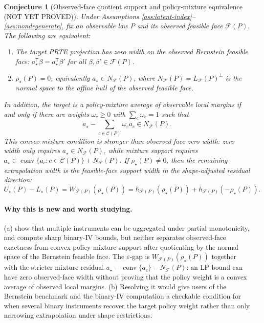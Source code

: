 \documentclass[11pt]{article}
\newcommand{\transpose}{\mathsf{T}}
\theoremstyle{definition}
\theoremstyle{plain}
\newtheorem{conjecture}{Conjecture}
\theoremstyle{remark}
\begin{document}
\begin{conjecture}[Observed-face quotient support and policy-mixture equivalence (NOT YET PROVED)]\label{conj:cone-equivalence}
Under Assumptions \ref{ass:latent-index}--\ref{ass:nondegenerate}, fix an observable law \(P\) and its observed feasible face \(\mathcal F(P)\). The following are equivalent:
\begin{enumerate}[label=(\roman*),leftmargin=*]
\item The target PRTE projection has zero width on the observed Bernstein feasible face: \(a_\star^\transpose\beta=a_\star^\transpose\beta'\) for all \(\beta,\beta'\in\mathcal F(P)\).
\item \(\rho_\star(P)=0\), equivalently \(a_\star\in N_{\mathcal F}(P)\), where \(N_{\mathcal F}(P)=L_{\mathcal F}(P)^\perp\) is the normal space to the affine hull of the observed feasible face.
\end{enumerate}
In addition, the target is a policy-mixture average of observable local margins if and only if there are weights \(\omega_c\ge0\) with \(\sum_c\omega_c=1\) such that
\[
a_\star-\sum_{c\in\mathcal C(P)}\omega_ca_c\in N_{\mathcal F}(P).
\]
This convex-mixture condition is stronger than observed-face zero width: zero width only requires \(a_\star\in N_{\mathcal F}(P)\), while mixture support requires \(a_\star\in\operatorname{conv}\{a_c:c\in\mathcal C(P)\}+N_{\mathcal F}(P)\). If \(\rho_\star(P)\neq0\), then the remaining extrapolation width is the feasible-face support width in the shape-adjusted residual direction:
\[
U_\star(P)-L_\star(P)
=W_{\mathcal F(P)}(\rho_\star(P))
=h_{\mathcal F(P)}(\rho_\star(P))+h_{\mathcal F(P)}(-\rho_\star(P)).
\]
\end{conjecture}

\paragraph{Why this is new and worth studying.}
(a) \citet{MogstadTorgovitskyWalters2024} show that multiple instruments can be aggregated under partial monotonicity, and \citet{HanYang2024} compute sharp binary-IV bounds, but neither separates observed-face exactness from convex policy-mixture support after quotienting by the normal space of the Bernstein feasible face. The \(\varepsilon\)-gap is \(W_{\mathcal F(P)}(\rho_\star(P))\) together with the stricter mixture residual \(a_\star-\operatorname{conv}\{a_c\}-N_{\mathcal F}(P)\): an LP bound can have zero observed-face width without proving that the policy weight is a convex average of observed local margins. (b) Resolving it would give users of the \citet{MogstadSantosTorgovitsky2018} Bernstein benchmark and the \citet{HanYang2024} binary-IV computation a checkable condition for when several binary instruments recover the target policy weight rather than only narrowing extrapolation under shape restrictions.
\end{document}
